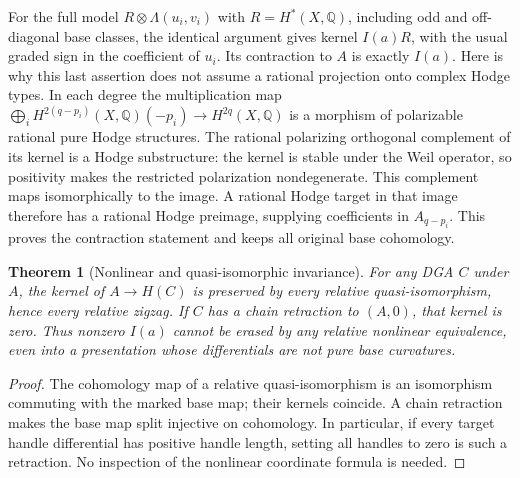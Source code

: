 \documentclass[11pt]{article}
\newtheorem{theorem}{Theorem}
\newcommand{\Q}{\mathbb Q}
\begin{document}
For the full model $R\otimes\Lambda(u_i,v_i)$ with
$R=H^*(X,\Q)$, including odd and off-diagonal base classes, the identical
argument gives kernel $I(a)R$, with the usual graded sign in the coefficient
of $u_i$. Its contraction to $A$ is exactly $I(a)$. Here is why this last
assertion does not assume a rational projection onto complex Hodge types.
In each degree the multiplication map
$\bigoplus_i H^{2(q-p_i)}(X,\Q)(-p_i)\to H^{2q}(X,\Q)$ is a morphism of
polarizable rational pure Hodge structures. The rational polarizing
orthogonal complement of its kernel is a Hodge substructure: the kernel
is stable under the Weil operator, so positivity makes the restricted
polarization nondegenerate. This complement maps isomorphically to the
image. A rational Hodge target in that image therefore has a rational
Hodge preimage, supplying coefficients in $A_{q-p_i}$. This proves the
contraction statement and keeps all original base cohomology.

\begin{theorem}[Nonlinear and quasi-isomorphic invariance]
For any DGA $C$ under $A$, the kernel of $A\to H(C)$ is preserved by every
relative quasi-isomorphism, hence every relative zigzag. If $C$ has a
chain retraction to $(A,0)$, that kernel is zero. Thus nonzero $I(a)$
cannot be erased by any relative nonlinear equivalence, even into a
presentation whose differentials are not pure base curvatures.
\end{theorem}
\begin{proof}
The cohomology map of a relative quasi-isomorphism is an isomorphism
commuting with the marked base map; their kernels coincide. A chain
retraction makes the base map split injective on cohomology. In particular,
if every target handle differential has positive handle length, setting
all handles to zero is such a retraction. No inspection of the nonlinear
coordinate formula is needed.
\end{proof}
\end{document}
